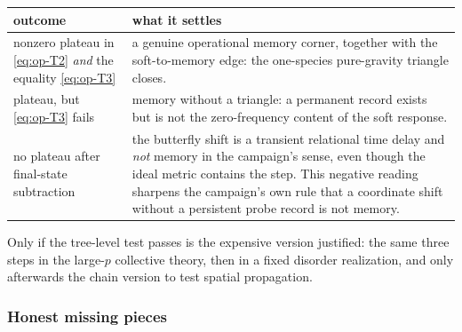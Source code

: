 \begin{center}
{\small
\begin{tabular}{@{}p{}p{}@{}}
\toprule
\textbf{outcome} & \textbf{what it settles} \\
\midrule
nonzero plateau in \eqref{eq:op-T2} \emph{and} the equality
\eqref{eq:op-T3} &
a genuine operational memory corner, together with the soft-to-memory edge:
the one-species pure-gravity triangle closes. \\
\midrule
plateau, but \eqref{eq:op-T3} fails &
memory without a triangle: a permanent record exists but is not the
zero-frequency content of the soft response. \\
\midrule
no plateau after final-state subtraction &
the butterfly shift is a transient relational time delay and \emph{not} memory
in the campaign's sense, even though the ideal metric contains the step. This
negative reading sharpens the campaign's own rule that a coordinate shift
without a persistent probe record is not memory. \\
\bottomrule
\end{tabular}
}
\end{center}

\noindent Only if the tree-level test passes is the expensive version
justified: the same three steps in the large-$p$ collective theory, then in a
fixed disorder realization, and only afterwards the chain version to test
spatial propagation.

\subsubsection*{Honest missing pieces}

